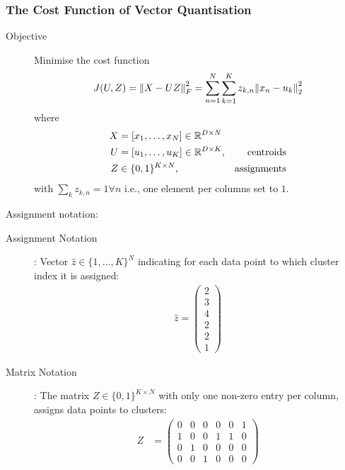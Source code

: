 \subsubsection{The Cost Function of Vector Quantisation}
\begin{description}
    \item[Objective] Minimise the cost function
        \begin{align*}
            J(U,Z) = \norm{X-UZ}_F^2 = \sum_{n=1}^N\sum_{k=1}^K z_{k,n} \norm{x_n-u_k}_2^2
        \end{align*}
        where
        \begin{align*}
            X &= [x_1,\ldots, x_N] \in \mathbb{R}^{D\times N}\\
            U &= [u_1,\ldots, u_K] \in \mathbb{R}^{D\times K}, &\text{centroids}\\
            Z &\in \{0,1\}^{K\times N}, &\text{assignments}
        \end{align*}
        with $\sum_k z_{k,n} = 1 \forall n$ i.e.,  one element per columns set to $1$.
\end{description}
Assignment notation:
\begin{description}
    \item[Assignment Notation]: Vector $\hat z \in \{1,\ldots,K\}^N$ indicating for each data point to which cluster index it is assigned:
    \begin{align*}
        \hat z = \begin{pmatrix}
                    2\\ 3\\ 4\\ 2 \\ 2\\ 1
                 \end{pmatrix}
    \end{align*}
    \item[Matrix Notation]: The matrix $Z\in \{0,1\}^{K\times N}$ with only one non-zero entry per column, assigns data points to clusters:
    \begin{align*}
        Z &= \begin{pmatrix}
                 0&0&0&0&0&1\\
                 1&0&0&1&1&0\\
                 0&1&0&0&0&0\\
                 0&0&1&0&0&0
             \end{pmatrix}
    \end{align*}
\end{description}
